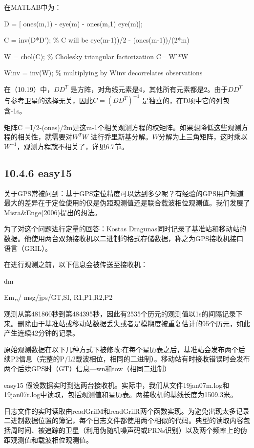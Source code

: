 在MATLAB中为：

D = [ ones(m,1) - eye(m) - ones(m,1) eye(m)];

C = inv(D*D'); \% C will be eye(m-1))/2 - (ones(m-1))/(2*m)

W = chol(C); \% Cholesky triangular factorization C= W'*W

Winv = inv(W); \% multiplying by Winv decorrelates observations

在（10.19）中，$DD^{T}$ 是方阵，对角线元素是4，其他所有元素都是2。由于$DD^{T}$ 与参考卫星的选择无关，因此$C=(DD^{T})^{-1}$ 是独立的，在D项中它的列包含-1s。

矩阵C =I/2-(ones)/2m是这m-1个相关观测方程的权矩阵。如果想降低这些观测方程的相关性，就需要对$W^{T}W$ 进行乔里斯基分解。$W$分解为上三角矩阵，这时乘以 $W^{-1}$，观测方程就不相关了，详见6.7节。

\subsection{10.4.6 easy15}

关于GPS常被问到：基于GPS定位精度可以达到多少呢？有经验的GPS用户知道最大的差异在于定位使用的仅是伪距观测值还是联合载波相位观测值。我们发展了Misra\&Enge(2006)提出的想法。

为了对这个问题进行定量的回答：Kostas Dragunas同时记录了基准站和移动站的数据。他使用两台双频接收机以二进制的格式存储数据，称之为GPS接收机接口语言（GRIL）。

在进行观测之前，以下信息会被传送至接收机：

dm

Em,,/ msg/jps/GT,SI, R1,P1,R2,P2

观测从第481860秒到第484395秒，因此有2535个历元的观测值以1s的间隔记录下来。删除由于基准站或移动站数据丢失或者是模糊度被重复估计的95个历元，如此产生连续42分钟的记录。

原始观测数据在以下几种方式下被修改:在每个星历表之后，基准站会发布两个后续P2信息（完整的P/L2载波相位，相同的二进制）。移动站有时接收错误时会发布两个后续GPS时（GT）信息—wn和tow（相同二进制）

easy15 假设数据实时到达两台接收机。实际中，我们从文件19jan07m.log和19jan07r.log中读取，包括观测值和星历表。两接收机的基线长度为1509.3米。

日志文件的实时读取由readGrilM和readGrilR两个函数实现。为避免出现太多记录二进制数据位置的簿记，每个日志文件都使用两个相似的代码。典型的读取内容包括周时间、被追踪的卫星（利用伪随机噪声码或PRNs识别）以及两个频率上的伪距观测值和载波相位观测值。

